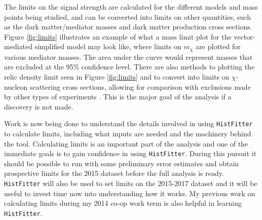 The limits on the signal strength are calculated for the different models and mass points being studied, and can be converted into limits on other quantities, such as the dark matter/mediator masses and dark matter production cross sections. Figure \ref{fig:limits} illustrates an example of what a mass limit plot for the vector-mediated simplified model may look like, where limits on $m_\chi$ are plotted for various mediator masses. The area under the curve would represent masses that are excluded at the 95\% confidence level. There are also methods to plotting the relic density limit seen in Figure \ref{fig:limits} and to convert into limits on $\chi$-nucleon scattering cross sections, allowing for comparison with exclusions made by other types of experiments \cite{Boveia:2016mrp}. This is the major goal of the analysis if a discovery is not made.

Work is now being done to understand the details involved in using \texttt{HistFitter} to calculate limits, including what inputs are needed and the machinery behind the tool. Calculating limits is an important part of the analysis and one of the immediate goals is to gain confidence in using \texttt{HistFitter}. During this pursuit it should be possible to run with some preliminary error estimates and obtain prospective limits for the 2015 dataset before the full analysis is ready. \texttt{HistFitter} will also be used to set limits on the 2015-2017 dataset and it will be useful to invest time now into understanding how it works. My previous work on calculating limits during my 2014 co-op work term is also helpful in learning \texttt{HistFitter}.